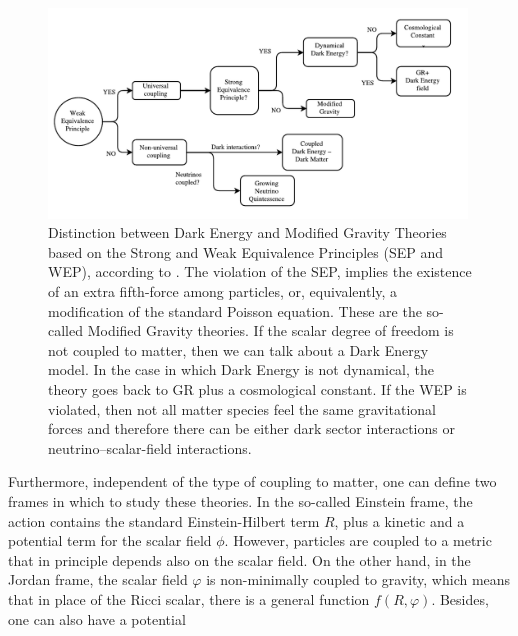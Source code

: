 \begin{figure}[htbp]
	\begin{center}
		\includegraphics[width=0.99\textwidth]
		{Figures/DE-MG.pdf}
	\end{center}
	\caption[Dark Energy - Modified Gravity Flowchart]{Distinction between Dark Energy and
		Modified Gravity Theories based on the Strong and Weak Equivalence Principles (SEP and WEP), according to \cite{Joyce, Lombrisier}.
		The violation of the SEP, implies the existence of an extra fifth-force among particles, 
		or, equivalently, a modification of the standard Poisson equation. These are the so-called Modified Gravity theories.
		If the scalar degree of freedom is not coupled to matter, then we can talk about a Dark Energy model.
		In the case in which Dark Energy is not dynamical, the theory goes back to GR plus a cosmological constant.
		If the WEP is violated, then not all matter species feel the same gravitational forces and therefore
		there can be either dark sector interactions or neutrino--scalar-field interactions.
	}\label{fig:DE-vs-MG-WEP-SEP}
\end{figure}
Furthermore, independent of the type of coupling to matter,
one can define two frames in which to study these theories. 
In the so-called Einstein frame, the action contains the standard Einstein-Hilbert term $R$,
plus a kinetic and a potential term for the scalar field $\phi$. 
However, particles are coupled to a metric that in principle depends also on the scalar field. 
On the other hand, in the Jordan frame, the scalar field $\varphi$ is non-minimally coupled
to gravity, which means that in place of the Ricci scalar,
there is a general function $f(R,\varphi)$. Besides, one can also have a potential
